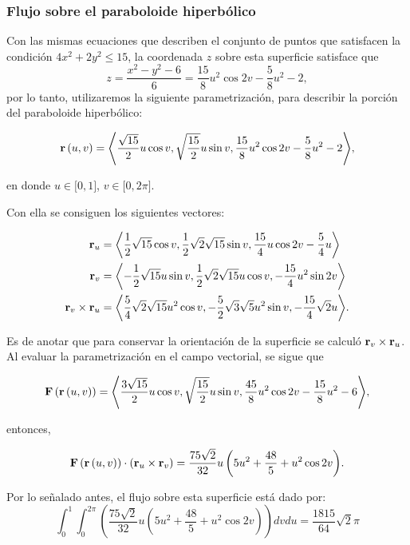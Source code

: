 \begin{parrafonumerado}
\subsubsection{Flujo sobre el paraboloide hiperbólico}

Con las mismas ecuaciones que describen el conjunto de puntos que satisfacen la condición $4x^{2}+2y^{2} \leq 15$,
la coordenada $z$ sobre esta superficie satisface que
\[z=\frac{x^2-y^2-6}{6}=\frac{15}{8}u^{2}\cos 2v-\frac{5}{8}u^{2}-2,\]
por lo tanto, utilizaremos la siguiente parametrización, para describir la porción del paraboloide hiperbólico:

{\small
\[{\bf r}\left( u,v\right) =\left\langle \frac{\sqrt{15}}{2}u\cos v,\sqrt{\frac{15}{2}}u\sin v,\frac{15}{8}u^{2}\cos 2v-\frac{5}{8}u^{2}-2\right\rangle\!,\]}

en donde $u\in \lbrack 0,1]$, $v\in \lbrack 0,2\pi ]$.

Con ella se consiguen los siguientes vectores:

{\small
\begin{align*}
{\bf r}_{u}&=\left\langle \frac{1}{2}\sqrt{15}\cos v,\frac{1}{2}\sqrt{2}\sqrt{15}\sin v,\frac{15}{4}u\cos 2v-\frac{5}{4}u\right\rangle \\
{\bf r}_{v}&= \left\langle -\frac{1}{2}\sqrt{15}u\sin v,\frac{1}{2}
\sqrt{2}\sqrt{15}u\cos v,-\frac{15}{4}u^{2}\sin 2v \right\rangle \\
{\bf r}_{v}\times {\bf r}_{u}&=\left\langle \frac{5}{4}\sqrt{2}\sqrt{15}u^{2}\cos v,-\frac{5}{2}\sqrt{3}\sqrt{5}u^{2}\sin v,-\frac{15}{4}\sqrt{2}u\right\rangle\!.
\end{align*}
}

Es de anotar que para conservar la orientación de la superficie se calculó ${\bf r}_{v}\times {\bf r}_{u}$. Al evaluar la parametrización en el campo vectorial, se sigue que

{\small
\[{\bf F}\left( {\bf r}\left( u,v\right) \right) =\left\langle \frac{3\sqrt{15}}{2}u\cos
v,\sqrt{\frac{15}{2}}u\sin v,\frac{45}{8}u^{2}\cos 2v-\frac{15}{8}u^{2}-6\right\rangle\!,\]}

entonces,

{\small
\[{\bf F}\left({\bf r}\left( u,v\right) \right) \cdot \left({\bf r}_{u}\times {\bf r}_{v}\right) =
\frac{75\sqrt{2}}{32}u\left( 5u^{2}+\frac{48}{5}+u^{2}\cos 2v\right)\!.\]}

Por lo señalado antes, el flujo sobre esta superficie está dado por:
{\small
\begin{equation}\label{flujo6}
\int_{0}^{1}\int_{0}^{2\pi }\left( \frac{75\sqrt{2}}{32}u\left( 5u^{2} + \frac{48}{5}+u^{2}\cos 2v\right) \right) dvdu= \frac{1815}{64}\sqrt{2}\pi
\end{equation}
}


\end{parrafonumerado}
